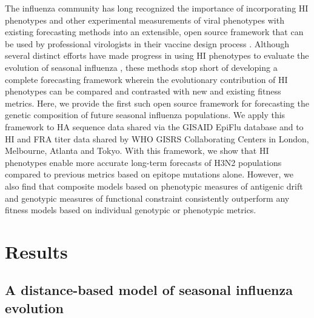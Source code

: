 The influenza community has long recognized the importance of incorporating HI phenotypes and other experimental measurements of viral phenotypes with existing forecasting methods into an extensible, open source framework that can be used by professional virologists in their vaccine design process \cite{Gandon:2016gz,Morris:2017ea,Lassig:2017hr}.
Although several distinct efforts have made progress in using HI phenotypes to evaluate the evolution of seasonal influenza \cite{Steinbruck:2014kq,Neher:2016hy}, these methods stop short of developing a complete forecasting framework wherein the evolutionary contribution of HI phenotypes can be compared and contrasted with new and existing fitness metrics.
Here, we provide the first such open source framework for forecasting the genetic composition of future seasonal influenza populations.
We apply this framework to HA sequence data shared via the GISAID EpiFlu database \cite{shu2017gisaid} and to HI and FRA titer data shared by WHO GISRS Collaborating Centers in London, Melbourne, Atlanta and Tokyo.
With this framework, we show that HI phenotypes enable more accurate long-term forecasts of H3N2 populations compared to previous metrics based on epitope mutations alone.
However, we also find that composite models based on phenotypic measures of antigenic drift and genotypic measures of functional constraint consistently outperform any fitness models based on individual genotypic or phenotypic metrics.

\section*{Results}

\subsection*{A distance-based model of seasonal influenza evolution}

